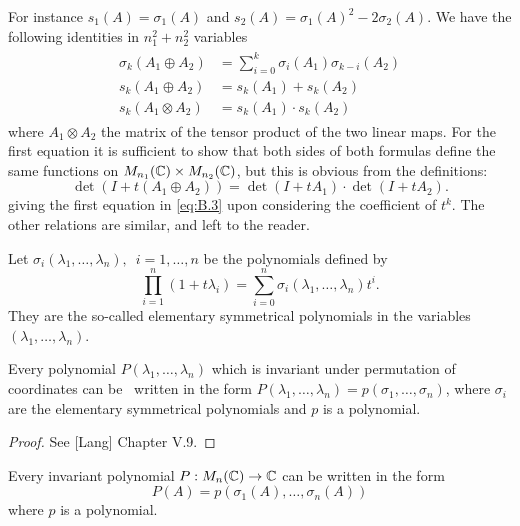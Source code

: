 For instance $s_1(A)=\sigma_1(A)$ and $s_2(A) = \sigma_1(A)^2-2\sigma_2(A)$. We have the following 
identities in $n_1^2+n_2^2$ variables
\begin{align}\label{eq:B.3}
  \begin{aligned}
    \sigma_k(A_1\oplus A_2) & = \sum_{i=0}^{k}{\sigma_i(A_1)\sigma_{k-i}(A_2)} \\
    s_k(A_1\oplus A_2) & = s_k(A_1) + s_{k}(A_2) \\
    s_k(A_1\otimes A_2) & = s_k(A_1)\cdot s_k(A_2)
  \end{aligned}
\end{align}
where $A_1\otimes A_2$ the matrix of the tensor product of the two linear maps. For the first
equation it is sufficient to show that both sides of both formulas define the same
functions on $M_{n_1}({\mathbb{C}})\times M_{n_2}({\mathbb{C}})$, but this is obvious from the definitions:
\[
  \det(I+t(A_1\oplus A_2)) = \det(I+tA_1)\cdot\det(I+tA_2).
\]
giving the first equation in \eqref{eq:B.3} upon considering the coefficient of $t^k$. The other
relations are similar, and left to the reader.

Let $\sigma_i(\lambda_1, \ldots, \lambda_n),\enspace i=1,\ldots, n$ be the polynomials defined by 
\[
  \prod_{i=1}^n (1+t\lambda_i) = \sum_{i=0}^{n }{\sigma_i(\lambda_1, \ldots, \lambda_n)t^i}.
\]
They are the so-called elementary symmetrical polynomials in the variables $(\lambda_1, \ldots, \lambda_n)$.

\begin{theorem}\label{theorem:B.3}
  Every polynomial $P(\lambda_1, \ldots, \lambda_n)$ which is invariant under permutation of coordinates can be \
  written in the form $P(\lambda_1, \ldots, \lambda_n)=p(\sigma_1, \ldots,\sigma_n)$, where $\sigma_i$ are the 
  elementary symmetrical polynomials and $p$ is a polynomial.
\end{theorem}

\begin{proof}
  See [Lang]\supercite{Lang} Chapter V.9.
\end{proof}

\begin{theorem}\label{theorem:B.4}
  Every invariant polynomial $P:M_n({\mathbb{C}})\to{\ensuremath{\mathbb{C}}}$ can be written in the form 
  \[
    P(A) = p(\sigma_1(A), \ldots, \sigma_n(A))
  \]
  where $p$ is a polynomial.
\end{theorem}

